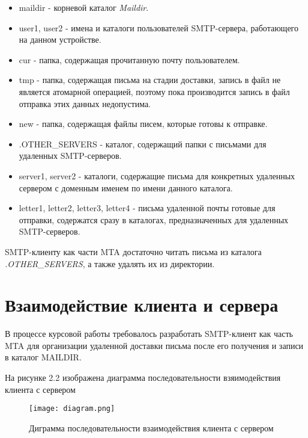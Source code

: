 \documentclass[a4paper,12pt]{report}
\begin{document}
	\begin{itemize}
		\item maildir - корневой каталог \textit{Maildir}.
		\item user1, user2 - имена и каталоги пользователей SMTP-сервера, работающего на данном устройстве.
		\item cur - папка, содержащая прочитанную почту пользователем.
		\item tmp - папка, содержащая письма на стадии доставки, запись в файл не является атомарной операцией, 
		поэтому пока производится запись в файл отправка этих данных недопустима.
		\item new - папка, содержащая файлы писем, которые готовы к отправке.
		\item .OTHER\_SERVERS - каталог, содержащий папки с письмами для удаленных SMTP-серверов.
		\item server1, server2 - каталоги, содержащие письма для конкретных удаленных 
		сервером с доменным именем по имени данного каталога.
		\item letter1, letter2, letter3, letter4 - письма удаленной почты готовые для отправки, 
		содержатся сразу в каталогах, предназначенных для удаленных SMTP-серверов.
	\end{itemize}
    
	SMTP-клиенту как части MTA достаточно читать письма из каталога \textit{.OTHER\_SERVERS}, 
	а также удалять их из директории.
	

	\section{Взаимодействие клиента и сервера}

	В процессе курсовой работы требовалось разработать SMTP-клиент как часть MTA 
	для организации удаленной доставки письма после его получения и записи в каталог MAILDIR. 

	На рисунке 2.2 изображена диаграмма последовательности взяимодействия клиента с сервером
	\begin{figure}
		\centering
		\texttt{[image: diagram.png]}
		\caption{Диграмма последовательности взаимодействия клиента с сервером} 
	\end{figure}
\end{document}
